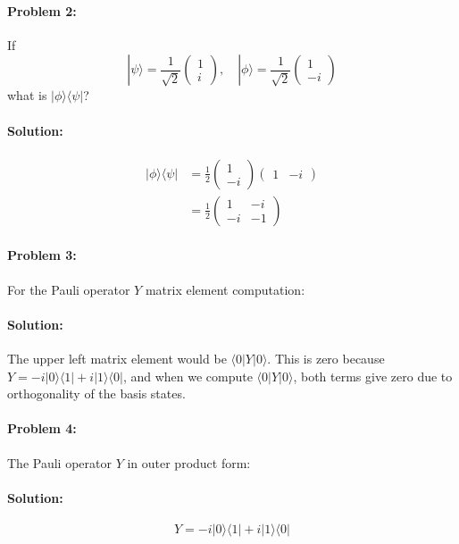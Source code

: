 \documentclass{article}
\begin{document}
\paragraph{Problem 2:} If
\[
|\psi\rangle = \frac{1}{\sqrt{2}} \begin{pmatrix} 1 \\ i \end{pmatrix}, \quad
|\phi\rangle = \frac{1}{\sqrt{2}} \begin{pmatrix} 1 \\ -i \end{pmatrix}
\]
what is \( |\phi\rangle \langle\psi| \)?

\paragraph{Solution:}
\begin{align*}
|\phi\rangle \langle\psi| &= \frac{1}{2} \begin{pmatrix} 1 \\ -i \end{pmatrix} \begin{pmatrix} 1 & -i \end{pmatrix} \\
&= \frac{1}{2} \begin{pmatrix} 1 & -i \\ -i & -1 \end{pmatrix}
\end{align*}

\paragraph{Problem 3:} For the Pauli operator \( Y \) matrix element computation:

\paragraph{Solution:}
The upper left matrix element would be \( \langle 0|Y|0\rangle \). This is zero because \( Y = -i|0\rangle\langle 1| + i|1\rangle\langle 0| \), and when we compute \( \langle 0|Y|0\rangle \), both terms give zero due to orthogonality of the basis states.

\paragraph{Problem 4:} The Pauli operator \( Y \) in outer product form:

\paragraph{Solution:}
\[
Y = -i|0\rangle\langle 1| + i|1\rangle\langle 0|
\]
\end{document}
